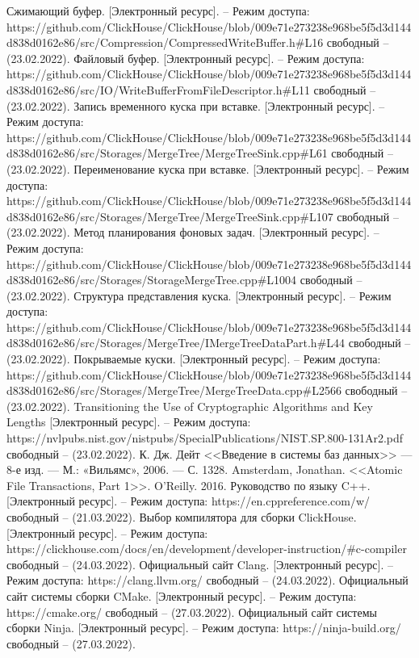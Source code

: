 \begin{thebibliography}{}
    Сжимающий буфер. [Электронный ресурс]. – Режим доступа: https://github.com/ClickHouse/ClickHouse/blob/009e71e273238e968be5f5d3d144d838d0162e86/src/Compression/CompressedWriteBuffer.h#L16 свободный – (23.02.2022).
    Файловый буфер. [Электронный ресурс]. – Режим доступа: https://github.com/ClickHouse/ClickHouse/blob/009e71e273238e968be5f5d3d144d838d0162e86/src/IO/WriteBufferFromFileDescriptor.h#L11 свободный – (23.02.2022).
    Запись временного куска при вставке. [Электронный ресурс]. – Режим доступа: https://github.com/ClickHouse/ClickHouse/blob/009e71e273238e968be5f5d3d144d838d0162e86/src/Storages/MergeTree/MergeTreeSink.cpp#L61 свободный – (23.02.2022).
    Переименование куска при вставке. [Электронный ресурс]. – Режим доступа: https://github.com/ClickHouse/ClickHouse/blob/009e71e273238e968be5f5d3d144d838d0162e86/src/Storages/MergeTree/MergeTreeSink.cpp#L107 свободный – (23.02.2022).
    Метод планирования фоновых задач. [Электронный ресурс]. – Режим доступа: https://github.com/ClickHouse/ClickHouse/blob/009e71e273238e968be5f5d3d144d838d0162e86/src/Storages/StorageMergeTree.cpp#L1004 свободный – (23.02.2022).
    Структура представления куска. [Электронный ресурс]. – Режим доступа: https://github.com/ClickHouse/ClickHouse/blob/009e71e273238e968be5f5d3d144d838d0162e86/src/Storages/MergeTree/IMergeTreeDataPart.h#L44 свободный – (23.02.2022).
    Покрываемые куски. [Электронный ресурс]. – Режим доступа: https://github.com/ClickHouse/ClickHouse/blob/009e71e273238e968be5f5d3d144d838d0162e86/src/Storages/MergeTree/MergeTreeData.cpp#L2566 свободный – (23.02.2022).
    Transitioning the Use of Cryptographic Algorithms and Key Lengths [Электронный ресурс]. – Режим доступа: https://nvlpubs.nist.gov/nistpubs/SpecialPublications/NIST.SP.800-131Ar2.pdf свободный – (23.02.2022).
    К. Дж. Дейт <<Введение в системы баз данных>> — 8-е изд. — М.: «Вильямс», 2006. — С. 1328.
    Amsterdam, Jonathan. <<Atomic File Transactions, Part 1>>. O'Reilly. 2016.
    Руководство по языку C++. [Электронный ресурс]. – Режим доступа: https://en.cppreference.com/w/ свободный – (21.03.2022).
    Выбор компилятора для сборки ClickHouse. [Электронный ресурс]. – Режим доступа: https://clickhouse.com/docs/en/development/developer-instruction/#c-compiler свободный – (24.03.2022).
    Официальный сайт Clang. [Электронный ресурс]. – Режим доступа: https://clang.llvm.org/ свободный – (24.03.2022).
    Официальный сайт системы сборки CMake. [Электронный ресурс]. – Режим доступа: https://cmake.org/ свободный – (27.03.2022).
    Официальный сайт системы сборки Ninja. [Электронный ресурс]. – Режим доступа: https://ninja-build.org/ свободный – (27.03.2022).
\end{thebibliography}
\endgroup

\pagebreak